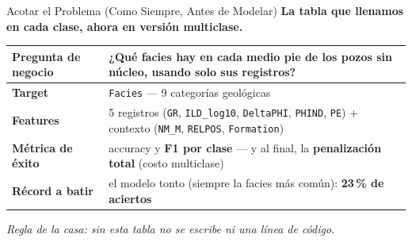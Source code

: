 \documentclass[aspectratio=169, 11pt]{beamer}
\begin{document}
\begin{frame}[shrink=8]{Acotar el Problema (Como Siempre, Antes de Modelar)}
  \vspace{-4pt}
  {\small\color{arcaDark}\bfseries
    La tabla que llenamos en cada clase, ahora en versión multiclase.}

  \vspace{8pt}
  {\footnotesize
  \begin{tabular}{@{}p{3.6cm}p{10.2cm}@{}}
    \toprule
    {\color{arcaDark}\bfseries Pregunta de negocio} &
      ¿Qué facies hay en cada medio pie de los pozos \textbf{sin núcleo},
      usando solo sus registros? \\
    \midrule
    {\color{arcaDark}\bfseries Target} &
      \texttt{Facies} --- 9 categorías geológicas \\
    \midrule
    {\color{arcaDark}\bfseries Features} &
      5 registros (\texttt{GR}, \texttt{ILD\_log10}, \texttt{DeltaPHI},
      \texttt{PHIND}, \texttt{PE}) + contexto (\texttt{NM\_M},
      \texttt{RELPOS}, \texttt{Formation}) \\
    \midrule
    {\color{arcaDark}\bfseries Métrica de éxito} &
      accuracy y \textbf{F1 por clase} --- y al final, la
      \textbf{penalización total} (costo multiclase) \\
    \midrule
    {\color{arcaDark}\bfseries Récord a batir} &
      el modelo tonto (siempre la facies más común):
      \textbf{23\,\% de aciertos} \\
    \bottomrule
  \end{tabular}
  }

  \vspace{8pt}
  {\scriptsize\color{textMuted}\itshape
    Regla de la casa: sin esta tabla no se escribe ni una línea de código.}
\end{frame}
\end{document}
